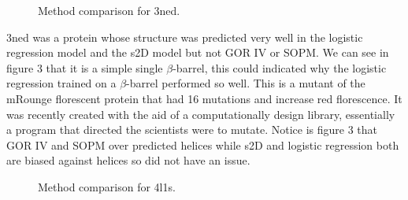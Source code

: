 \documentclass{article}
\begin{document}
\begin{figure}[h]
  \centering
  \caption{Method comparison for 3ned. }
\end{figure}

3ned was a protein whose structure was predicted very well in the logistic regression model and the s2D model but not GOR IV or SOPM. We can see in figure 3 that it is a simple single $\beta$-barrel, this could indicated why the logistic regression trained on a $\beta$-barrel performed so well. This is a mutant of the mRounge florescent protein that had 16 mutations and increase red florescence. It was recently created with the aid of a computationally design library, essentially a program that directed the scientists were to mutate. Notice is figure 3 that GOR IV and SOPM over predicted helices while s2D and logistic regression both are biased against helices so did not have an issue. 

\begin{figure}[h]
  \centering
  \caption{Method comparison for 4l1s. }
\end{figure}
\end{document}
